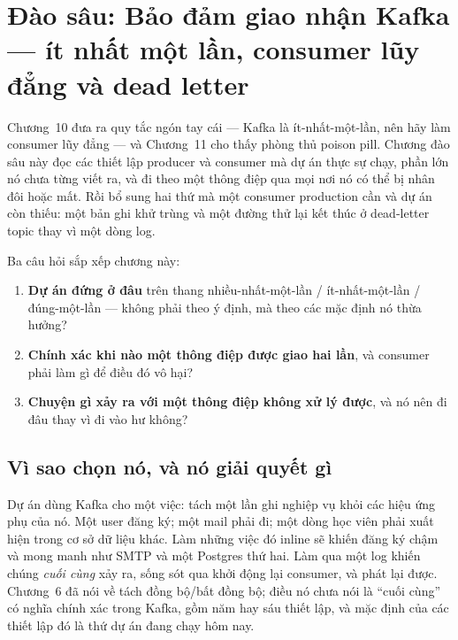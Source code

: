 \chapter{Đào sâu: Bảo đảm giao nhận Kafka --- ít nhất một lần, consumer lũy đẳng và dead letter}
\label{ch:dd-kafka}

Chương~10 đưa ra quy tắc ngón tay cái --- Kafka là ít-nhất-một-lần, nên
hãy làm consumer lũy đẳng --- và Chương~11 cho thấy phòng thủ poison
pill. Chương đào sâu này đọc các thiết lập producer và consumer mà dự
án thực sự chạy, phần lớn nó chưa từng viết ra, và đi theo một thông
điệp qua mọi nơi nó có thể bị nhân đôi hoặc mất. Rồi bổ sung hai thứ mà
một consumer production cần và dự án còn thiếu: một bản ghi khử trùng
và một đường thử lại kết thúc ở dead-letter topic thay vì một dòng log.

Ba câu hỏi sắp xếp chương này:

\begin{enumerate}
  \item \textbf{Dự án đứng ở đâu} trên thang nhiều-nhất-một-lần /
  ít-nhất-một-lần / đúng-một-lần --- không phải theo ý định, mà theo
  các mặc định nó thừa hưởng?
  \item \textbf{Chính xác khi nào một thông điệp được giao hai lần}, và
  consumer phải làm gì để điều đó vô hại?
  \item \textbf{Chuyện gì xảy ra với một thông điệp không xử lý được},
  và nó nên đi đâu thay vì đi vào hư không?
\end{enumerate}

\section{Vì sao chọn nó, và nó giải quyết gì}

Dự án dùng Kafka cho một việc: tách một lần ghi nghiệp vụ khỏi các hiệu
ứng phụ của nó. Một user đăng ký; một mail phải đi; một dòng học viên
phải xuất hiện trong cơ sở dữ liệu khác. Làm những việc đó inline sẽ
khiến đăng ký chậm và mong manh như SMTP và một Postgres thứ hai. Làm
qua một log khiến chúng \emph{cuối cùng} xảy ra, sống sót qua khởi động
lại consumer, và phát lại được. Chương~6 đã nói về tách đồng bộ/bất
đồng bộ; điều nó chưa nói là ``cuối cùng'' có nghĩa chính xác trong
Kafka, gồm năm hay sáu thiết lập, và mặc định của các thiết lập đó là
thứ dự án đang chạy hôm nay.

